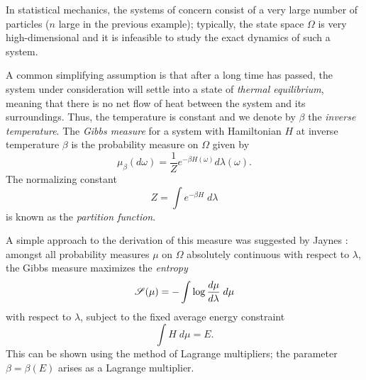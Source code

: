 In statistical mechanics, the systems of concern consist of a very large number
of particles ($n$ large in the previous example); typically, the state space $\Omega$ is very
high-dimensional and it is infeasible to study the exact dynamics of such a system.

A common simplifying assumption is that after a long time has passed, the system
under consideration will settle into a state of \emph{thermal equilibrium}, meaning
that there is no net flow of heat between the system and its surroundings. Thus,
the temperature is constant and we denote by $\beta$ the \emph{inverse temperature}.
The \emph{Gibbs measure} \cite{Gibbs60} for a system with Hamiltonian $H$ at inverse temperature
$\beta$ is the probability measure on $\Omega$ given by
\begin{equation}
\label{e:gibbs-def}
\mu_\beta(d\omega) = \frac{1}{Z} e^{-\beta H(\omega)} d\lambda(\omega).
\end{equation}
The normalizing constant
\begin{equation}
Z = \int e^{-\beta H} \; d\lambda
\end{equation}
is known as the \emph{partition function}.

A simple approach to the derivation of this measure was suggested by Jaynes \cite{Jaynes57}:
amongst all probability measures $\mu$ on $\Omega$ absolutely
continuous with respect to $\lambda$, the Gibbs measure maximizes the \emph{entropy}
\begin{equation}
\label{e:entropy-def}
\mathscr{S}(\mu) = -\int \log \frac{d\mu}{d\lambda} \; d\mu
\end{equation}
with respect to $\lambda$, subject to the fixed average energy constraint
\begin{equation}
\label{e:fix-avg-energy}
\int H \; d\mu = E.
\end{equation}
This can be shown using the method of Lagrange multipliers;
the parameter $\beta = \beta(E)$ arises as a Lagrange multiplier.


